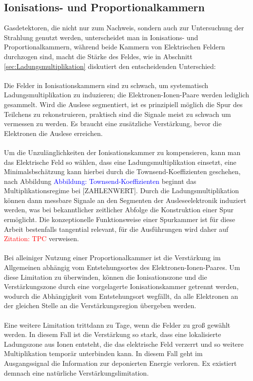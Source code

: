 		\subsection{Ionisations- und Proportionalkammern} \label{sec:IonisationsundProportionalkammern}
			 Gasdetektoren, die nicht nur zum Nachweis, sondern auch zur Untersuchung der Strahlung genutzt werden, unterscheidet man in Ionisations- und Proportionalkammern, während beide Kammern von Elektrischen Feldern durchzogen sind, macht die Stärke des Feldes, wie in Abschnitt \ref{sec:Ladungsmultiplikation} diskutiert den entscheidenden Unterschied:\\
			 \\
			 Die Felder in Ionisationskammern sind zu schwach, um systematisch Ladungsmultiplikation zu induzieren; die Elektronen-Ionen-Paare werden lediglich gesammelt. Wird die Auslese segmentiert, ist es prinzipiell möglich die Spur des Teilchens zu rekonstruieren, praktisch sind die Signale meist zu schwach um vermessen zu werden. Es braucht eine zusätzliche Verstärkung, bevor die Elektronen die Auslese erreichen.\\
			\\
			 Um die Unzulänglichkeiten der Ionisationskammer zu kompensieren, kann man das Elektrische Feld so wählen, dass eine Ladungsmultiplikation einsetzt, eine Minimalsbschätzung kann hierbei durch die Townsend-Koeffizienten geschehen, nach Abbildung \textcolor{blue}{Abbildung: Townsend-Koeffizienten} beginnt das Multiplikationsregime bei [ZAHLENWERT]. Durch die Ladungsmultiplikation können dann messbare Signale an den Segmenten der Ausleseelektronik induziert werden, was bei bekanntlicher zeitlicher Abfolge die Konstruktion einer Spur ermöglicht. Die konzeptionelle Funktionsweise einer Spurkammer ist für diese Arbeit bestenfalls tangential relevant, für die Ausführungen wird daher auf \textcolor{red}{Zitation: TPC} verweisen.\\
			 \\
			  Bei alleiniger Nutzung einer Proportionalkammer ist die Verstärkung im Allgemeinen abhängig vom Entstehungsortes des Elektronen-Ionen-Paares. Um diese Limitation zu überwinden, können die Ionisationszone und die Verstärkungszone durch eine vorgelagerte Ionisationskammer getrennt werden, wodurch die Abhängigkeit vom Entstehungsort wegfällt, da alle Elektronen an der gleichen Stelle an die Verstärkungsregion übergeben werden.\\
			  \\
			  Eine weitere Limitation trittdann zu Tage, wenn die Felder zu groß gewählt werden. In diesem Fall ist die Verstärkung so stark, dass eine lokalisierte Ladungszone aus Ionen entsteht, die das elektrische Feld verzerrt und so weitere Multiplikation temporär unterbinden kann. In diesem Fall geht im Ausgangssignal die Information zur deponierten Energie verloren. Ex existiert demnach eine natürliche Verstärkungslimitation.
			 
